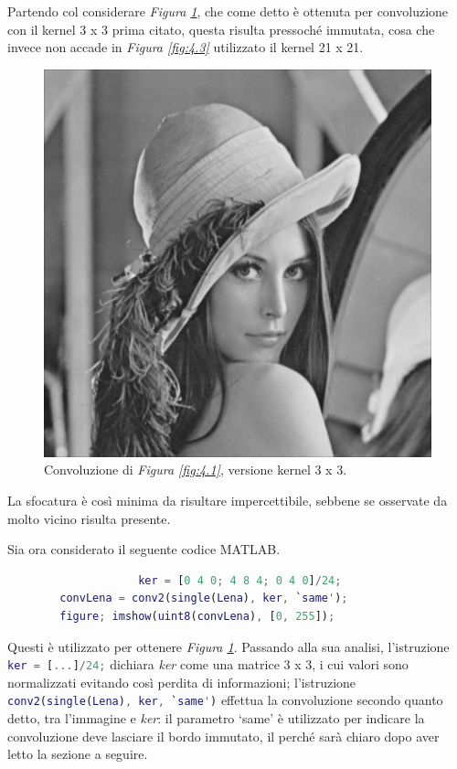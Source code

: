 \documentclass{subfiles}
\begin{document}
Partendo col considerare \emph{Figura \ref{fig:4.2}}, che come detto è ottenuta per convoluzione con il kernel 3 x 3 prima citato,
questa risulta pressoché immutata, cosa che invece non accade in \emph{Figura \ref{fig:4.3}} utilizzato il kernel 21 x 21.
\begin{figure}
    \centering
    \includegraphics[scale = 0.325]{../Images/Lena/MeanConvolutionLena.png}
    \caption{Convoluzione di \emph{Figura \ref{fig:4.1}}, versione kernel 3 x 3.}
    \label{fig:4.2}
\end{figure}
La sfocatura è così minima da risultare impercettibile, sebbene se osservate da molto vicino risulta presente.

Sia ora considerato il seguente codice MATLAB.
\begin{center}
    \begin{lstlisting}[language = MATLAB]
                    % caricamento dell'immagine Lena
                    ker = [0 4 0; 4 8 4; 0 4 0]/24;
        convLena = conv2(single(Lena), ker, `same');
        figure; imshow(uint8(convLena), [0, 255]);
    \end{lstlisting}
\end{center}
Questi è utilizzato per ottenere \emph{Figura \ref{fig:4.2}}. Passando alla sua analisi, l'istruzione \lstinline[language = MATLAB]{ker = [...]/24;}
dichiara \emph{ker} come una matrice 3 x 3, i cui valori sono normalizzati evitando così perdita di informazioni;
l'istruzione \lstinline[language = MATLAB]{conv2(single(Lena), ker, `same')} effettua la convoluzione secondo quanto detto, tra l'immagine e \emph{ker}:
il parametro `same' è utilizzato per indicare la convoluzione deve lasciare il bordo immutato, il perché sarà chiaro dopo aver letto la sezione a seguire.
\end{document}
